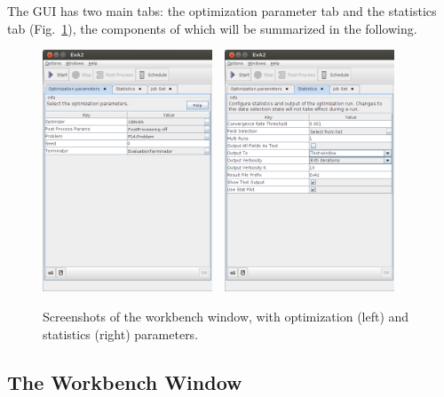 The  GUI has two main tabs: the optimization parameter tab
and the statistics tab (Fig.~\ref{fig:Screenshots-workbench}), the
components of which will be summarized in the following.

\begin{figure}
\noindent \begin{centering}
\includegraphics[width=0.45\textwidth]{pics/screenshot-workb-2013}~~\includegraphics[width=0.45\textwidth]{pics/screenshot-stat-2013}
\par\end{centering}

\caption{Screenshots of the workbench window, with optimization (left) and
statistics (right) parameters.\label{fig:Screenshots-workbench}}
\end{figure}



\subsection{The Workbench Window\label{sub:The-Workbench-Window}}


